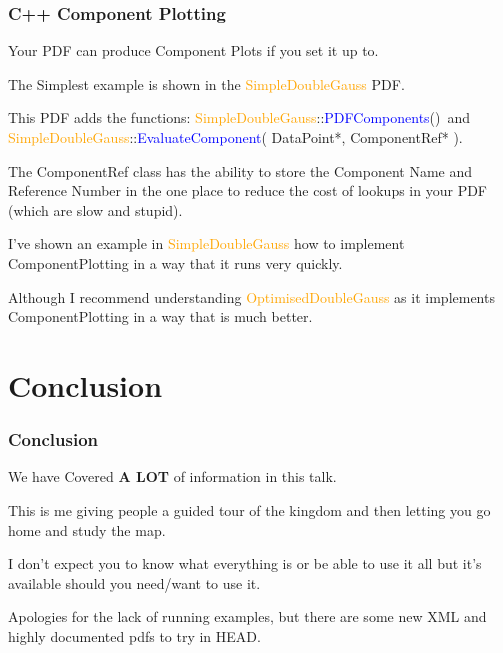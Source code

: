 \documentclass{beamer}
\begin{document}
\begin{frame}
\frametitle{C++ Component Plotting}
Your PDF can produce Component Plots if you set it up to.\newline

The Simplest example is shown in the \textcolor{orange}{SimpleDoubleGauss} PDF.\newline

This PDF adds the functions:\newline\scriptsize
\textcolor{orange}{SimpleDoubleGauss}::\textcolor{blue}{PDFComponents}()\normalsize ~and \scriptsize \textcolor{orange}{SimpleDoubleGauss}::\textcolor{blue}{EvaluateComponent}( DataPoint*, ComponentRef* ).\normalsize

The ComponentRef class has the ability to store the Component Name and Reference Number in the one place to reduce the cost of lookups in your PDF (which are slow and stupid).\newline

I've shown an example in \textcolor{orange}{SimpleDoubleGauss} how to implement ComponentPlotting in a way that it runs very quickly.\newline

Although I recommend understanding \textcolor{orange}{OptimisedDoubleGauss} as it implements ComponentPlotting in a way that is much better.

\end{frame}


\section{Conclusion}
\begin{frame}
\frametitle{Conclusion}
We have Covered \textbf{A LOT} of information in this talk.\newline\newline

This is me giving people a guided tour of the kingdom and then letting you go home and study the map.\newline\newline

I don't expect you to know what everything is or be able to use it all but it's available should you need/want to use it.\newline\newline

Apologies for the lack of running examples, but there are some new XML and highly documented pdfs to try in HEAD.\newline\newline

\end{frame}
\end{document}
